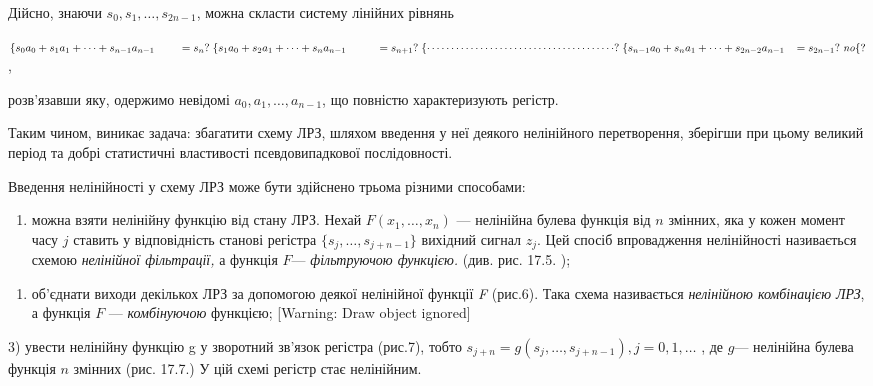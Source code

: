 Дійсно, знаючи  ${s_{{0}},s_{{1}},\dots,s_{{2n-1}}}$, можна
скласти систему лінійних рівнянь


\bigskip

{\centering

${\begin{matrix}\left\{s_{{0}}a_{{0}}+s_{{1}}a_{{1}}+\dots+s_{{n-1}}a_{{n-1}}\;\;\;\;\;\;\;\;=s_{{n}}?\right.\left\{s_{{1}}a_{{0}}+s_{{2}}a_{{1}}+\dots+s_{{n}}a_{{n-1}}\;\;\;\;\;\;\;\;\;\;=s_{{n+1}}?\right.\left\{\cdots
\cdots \cdots \cdots \cdots \cdots \cdots \cdots \cdots \cdots \cdots \cdots
\cdots
?\right.\left\{s_{{n-1}}a_{{0}}+s_{{n}}a_{{1}}+\dots+s_{{2n-2}}a_{{n-1}}\;\;\;=s_{{2n-1}}?\right.\mathit{no}\hfill\null
\end{matrix}\{?}$,
\par}


\bigskip

розв’язавши яку, одержимо невідомі 
${a_{{0}},a_{{1}},\dots,a_{{n-1}}}$, що повністю
характеризують регістр.

Таким чином, виникає задача: збагатити схему ЛРЗ, шляхом введення у неї деякого
нелінійного перетворення, зберігши при цьому великий період та добрі
статистичні властивості псевдовипадкової послідовності.

Введення нелінійності у схему ЛРЗ може бути здійснено трьома різними способами:

\liststyleWWviiiNumxlvii
\begin{enumerate}
\item можна взяти нелінійну функцію від стану ЛРЗ. Нехай 
${F(x_{{1}},\dots,x_{{n}})}$ --- нелінійна булева функція від 
${n}$ змінних, яка у кожен момент часу  ${j}$ ставить у відповідність станові
регістра  ${\{s_{{j}},\dots,s_{{j+n-1}}\}}$ вихідний сигнал 
${z_{{j}}}$. Цей спосіб впровадження нелінійності називається схемою
\textit{нелінійної фільтрації, }а функція  ${F}$---  \textit{фільтруючою
функцією. }(див. рис.\textcolor{red}{ }17.5. );
\end{enumerate}

\bigskip

{\par}


\bigskip


\bigskip

\liststyleWWviiiNumxlvii
\setcounter{saveenum}{\value{enumi}}
\begin{enumerate}
\setcounter{enumi}{\value{saveenum}}
\item об’єднати виходи декількох ЛРЗ за допомогою деякої нелінійної функції
\textit{F} (рис.6). Така схема називається \textit{нелінійною комбінацією ЛРЗ},
а функція  ${F}$ --- \textit{комбінуючою }функцією; [Warning: Draw object
ignored]
\end{enumerate}
3)  увести нелінійну функцію g у зворотний зв’язок регістра (рис.7), тобто 
${s_{{j+n}}=g(s_{{j}},\dots,s_{{j+n-1}}),j=0,1,\dots}$
, де  ${g}$--- нелінійна булева функція  ${n}$ змінних (рис. 17.7.)  У цій схемі 
регістр стає нелінійним. 


